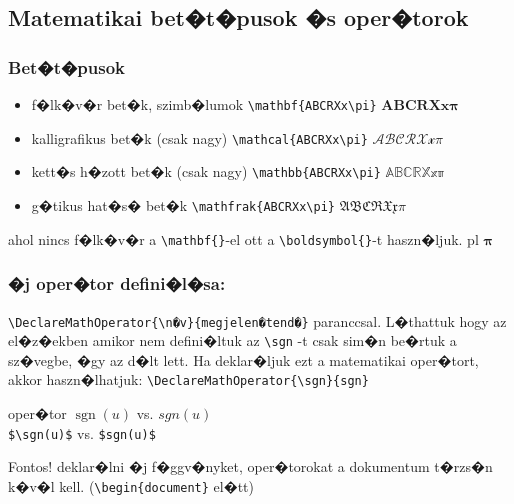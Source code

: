 \documentclass[xcolor=pdftex,dvipsnames,table,compress,bigger]{beamer}
\DeclareMathOperator{\sgn}{sgn}
\begin{document}
\subsection{Matematikai bet�t�pusok �s oper�torok}
\begin{frame}[fragile]
    \frametitle{Bet�t�pusok}
    \begin{itemize}
    \item f�lk�v�r bet�k, szimb�lumok \verb*|\mathbf{ABCRXx\pi}| $\mathbf{ABCRXx\pi}$
    \item kalligrafikus bet�k (csak nagy) \verb*|\mathcal{ABCRXx\pi}|  $\mathcal{ABCRXx\pi}$
    \item kett�s h�zott bet�k (csak nagy) \verb*|\mathbb{ABCRXx\pi}|  $\mathbb{ABCRXx\pi}$
    \item g�tikus hat�s� bet�k  \verb*|\mathfrak{ABCRXx\pi}|  $\mathfrak{ABCRXx\pi}$
    \end{itemize}
    ahol nincs f�lk�v�r a \verb*|\mathbf{}|-el ott a \verb*|\boldsymbol{}|-t haszn�ljuk. pl $\boldsymbol{\pi}$\\
\end{frame}


\begin{frame}[fragile]
    \frametitle{�j oper�tor defini�l�sa:}
    \verb*|\DeclareMathOperator{\n�v}{megjelen�tend�}| paranccsal.
    L�thattuk hogy az el�z�ekben amikor nem defini�ltuk az \verb*|\sgn| -t csak sim�n be�rtuk a sz�vegbe, �gy az d�lt lett.
    Ha deklar�ljuk ezt a matematikai oper�tort, akkor haszn�lhatjuk:
    \verb*|\DeclareMathOperator{\sgn}{sgn}|
    \begin{block}{oper�tor}
    $\sgn(u)$ vs. $sgn(u)$\\
    \verb*|$\sgn(u)$| vs. \verb*|$sgn(u)$|
    \end{block}
    \begin{alertblock}{Fontos!}
    deklar�lni �j f�ggv�nyket, oper�torokat a dokumentum t�rzs�n k�v�l kell. (\verb*|\begin{document}| el�tt)
    \end{alertblock}
    
\end{frame}
\end{document}
